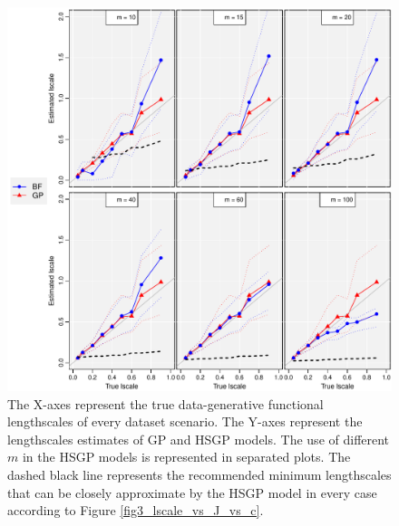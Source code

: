 \documentclass[]{interact}
\theoremstyle{plain}%
\theoremstyle{definition}
\theoremstyle{remark}
\begin{document}
\begin{figure}
\centering
\includegraphics[width=\textwidth]{fig8_Tlscale_vs_Elscale.pdf}
\caption{The X-axes represent the true data-generative functional lengthscales of every dataset scenario. The Y-axes represent the lengthscales estimates of GP and HSGP models. The use of different $m$ in the HSGP models is represented in separated plots. The dashed black line represents the recommended minimum lengthscales that can be closely approximate by the HSGP model in every case according to Figure \ref{fig3_lscale_vs_J_vs_c}.}
  \label{fig8_Tlscale_vs_Elscale}
\end{figure}
\end{document}

